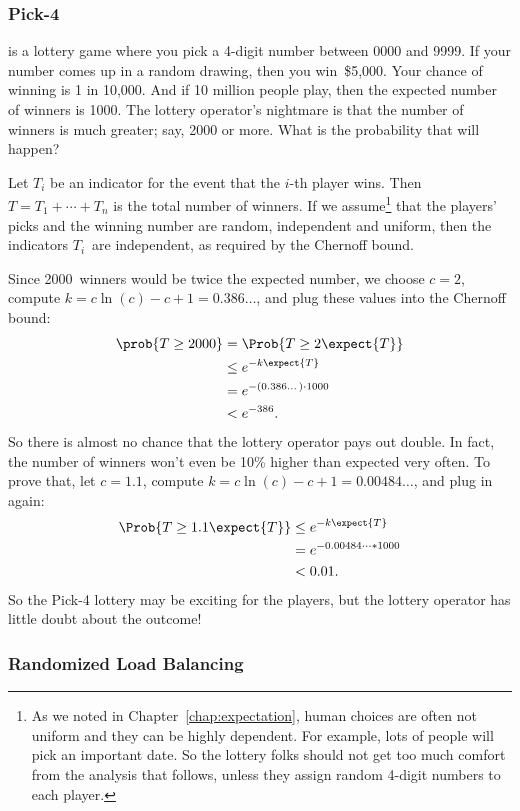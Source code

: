 \subsubsection{Pick-4}

 is a lottery game where you pick a 4-digit number between
0000 and 9999.  If your number comes up in a random drawing, then you
win~\$5,000.  Your chance of winning is 1 in 10,000.  And if 10
million people play, then the expected number of winners is 1000.  The
lottery operator's nightmare is that the number of winners is much
greater; say, 2000 or more.  What is the probability that will happen?

Let $T_i$ be an indicator for the event that the $i$-th player wins.
Then $T = T_1 + \cdots + T_n$ is the total number of winners.  If we
assume\footnote{As we noted in Chapter~\ref{chap:expectation}, human
  choices are often not uniform and they can be highly dependent.  For
  example, lots of people will pick an important date.  So the lottery
  folks should not get too much comfort from the analysis that
  follows, unless they assign random 4-digit numbers to each player.}
that the players' picks and the winning number are random, independent
and uniform, then the indicators $T_i$~are independent, as required by
the Chernoff bound.


Since 2000~winners would be twice the expected number, we choose $c =
2$, compute $k = c \ln(c) - c + 1 = 0.386\dots$, and plug these values
into the Chernoff bound:
\begin{align*}
\prob{T \geq 2000} & = \Prob{T \geq 2 \expect{T}} \\
  & \leq e^{-k \expect{T}} \\
  & = e^{- (0.386\dots) \cdot 1000} \\
  & < e^{-386}.
\end{align*}
So there is almost no chance that the lottery operator pays out
double.  In fact, the number of winners won't even be 10\% higher than
expected very often.  To prove that, let $c = 1.1$, compute $k = c
\ln(c) - c + 1 = 0.00484\dots$, and plug in again:
\begin{align*}
\Prob{T \geq 1.1 \expect{T}} & \leq e^{-k \expect{T}} \\
  & = e^{- 0.00484\dots * 1000} \\
  & < 0.01.
\end{align*}
So the Pick-4 lottery may be exciting for the players, but the lottery
operator has little doubt about the outcome!

\subsubsection{Randomized Load Balancing}


